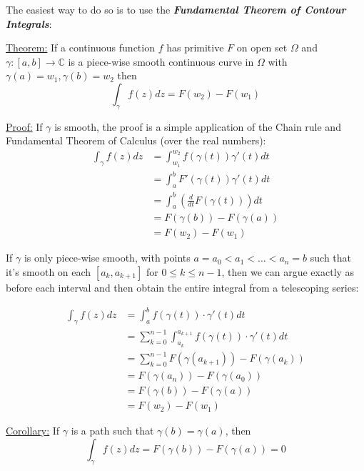 \documentclass{article}
\newcommand{\C}{\mathbb{C}}
\begin{document}
\begin{enumerate}[label=(\alph*)]
  The easiest way to do so is to use the \emph{\textbf{Fundamental Theorem of Contour Integrals}}:
  \begin{dottedbox}
    \underline{Theorem:} If a continuous function $f$ has primitive $F$ on open set $\Omega$ and $\gamma : [a, b] \rightarrow \C$ is a piece-wise smooth continuous curve in $\Omega$ with $\gamma(a) = w_1, \gamma(b) = w_2$ then
    \[ \int_{\gamma} f(z)dz = F(w_2) - F(w_1)  \]
  \end{dottedbox}
  
  \vskip 0.5cm
  \underline{Proof:} If $\gamma$ is smooth, the proof is a simple application of the Chain rule and Fundamental Theorem of Calculus (over the real numbers):
  \begin{align*}
    \int_{\gamma} f(z) dz &= \int_{w_1}^{w_2} f(\gamma(t)) \gamma'(t) dt \\
    &= \int_{a}^{b} F'(\gamma(t)) \gamma'(t) dt \\
    &= \int_{a}^{b} \left( \frac{d}{dt} F(\gamma(t)) \right) dt \\
    &= F(\gamma(b)) - F(\gamma(a)) \\
    &= F(w_2) - F(w_1)
  \end{align*} 

  \vskip 0.5cm
  If $\gamma$ is only piece-wise smooth, with points $a = a_0 < a_1 < \dots < a_{n} = b$ such that it's smooth on each $[a_k, a_{k+1}]$ for $0 \leq k \leq n-1$, then we can argue exactly as before each interval and then obtain the entire integral from a telescoping series:

  \begin{align*}
    \int_{\gamma} f(z)dz &= \int_{a}^{b} f(\gamma(t)) \cdot \gamma'(t) dt \\
    &= \sum_{k = 0}^{n - 1} \int_{a_k}^{a_{k+1}} f(\gamma(t)) \cdot \gamma'(t) dt \\
    &= \sum_{k = 0}^{n - 1} F(\gamma(a_{k+1})) - F(\gamma(a_k)) \\
    &= F(\gamma(a_{n})) - F(\gamma(a_0)) \\
    &= F(\gamma(b)) - F(\gamma(a)) \\
    &= F(w_2) - F(w_1)
  \end{align*}
  
  \begin{dottedbox}
    \underline{Corollary:} If $\gamma$ is a path such that $\gamma(b) = \gamma(a)$, then 
    \[ \int_{\gamma} f(z)dz = F(\gamma(b)) - F(\gamma(a)) = 0 \]
  \end{dottedbox}    


\end{enumerate}
\end{document}
